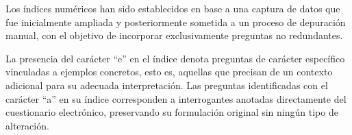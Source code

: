 

Los índices numéricos han sido establecidos en base a una captura de datos que fue inicialmente ampliada y posteriormente sometida a un proceso de depuración manual, con el objetivo de incorporar exclusivamente preguntas no redundantes.

La presencia del carácter ``e'' en el índice denota preguntas de carácter específico vinculadas a ejemplos concretos, esto es, aquellas que precisan de un contexto adicional para su adecuada interpretación. Las preguntas identificadas con el carácter ``a'' en su índice corresponden a interrogantes anotadas directamente del cuestionario electrónico, preservando su formulación original sin ningún tipo de alteración.

